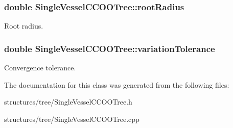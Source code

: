 \subsubsection[{\texorpdfstring{root\+Radius}{rootRadius}}]{\setlength{\rightskip}{0pt plus 5cm}double Single\+Vessel\+C\+C\+O\+O\+Tree\+::root\+Radius\hspace{0.3cm}{\ttfamily [private]}}\hypertarget{class_single_vessel_c_c_o_o_tree_a92984c132be3e2eaed34adfc261afa48}{}\label{class_single_vessel_c_c_o_o_tree_a92984c132be3e2eaed34adfc261afa48}
Root radius. 
\subsubsection[{\texorpdfstring{variation\+Tolerance}{variationTolerance}}]{\setlength{\rightskip}{0pt plus 5cm}double Single\+Vessel\+C\+C\+O\+O\+Tree\+::variation\+Tolerance\hspace{0.3cm}{\ttfamily [private]}}\hypertarget{class_single_vessel_c_c_o_o_tree_abd14cc5350019a67cc3f8ff881af58e4}{}\label{class_single_vessel_c_c_o_o_tree_abd14cc5350019a67cc3f8ff881af58e4}
Convergence tolerance. 

The documentation for this class was generated from the following files\+:\begin{DoxyCompactItemize}
\item 
structures/tree/Single\+Vessel\+C\+C\+O\+O\+Tree.\+h\item 
structures/tree/Single\+Vessel\+C\+C\+O\+O\+Tree.\+cpp\end{DoxyCompactItemize}
